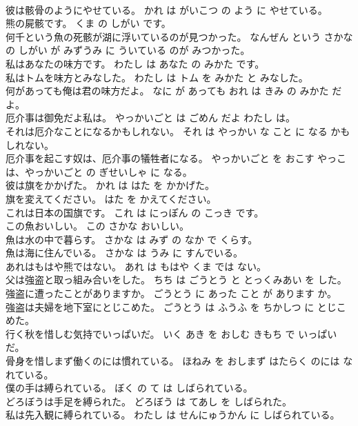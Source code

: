 \documentclass[8pt]{extreport}
\begin{document}
\begin{CJK}{UTF8}{min}
\\	彼は骸骨のようにやせている。	かれ は がいこつ の よう に やせている。	
\\	熊の屍骸です。	くま の しがい です。	
\\	何千という魚の死骸が湖に浮いているのが見つかった。	なんぜん という さかな の しがい が みずうみ に ういている のが みつかった。	
\\	私はあなたの味方です。	わたし は あなた の みかた です。	
\\	私はトムを味方とみなした。	わたし は トム を みかた と みなした。	
\\	何があっても俺は君の味方だよ。	なに が あっても おれ は きみ の みかた だよ。	
\\	厄介事は御免だよ私は。	やっかいごと は ごめん だよ わたし は。	
\\	それは厄介なことになるかもしれない。	それ は やっかい な こと に なる かもしれない。	
\\	厄介事を起こす奴は、厄介事の犠牲者になる。	やっかいごと を おこす やっこ は、やっかいごと の ぎせいしゃ に なる。	
\\	彼は旗をかかげた。	かれ は はた を かかげた。	
\\	旗を変えてください。	はた を かえてください。	
\\	これは日本の国旗です。	これ は にっぽん の こっき です。	
\\	この魚おいしい。	この さかな おいしい。	
\\	魚は水の中で暮らす。	さかな は みず の なか で くらす。	
\\	魚は海に住んでいる。	さかな は うみ に すんでいる。	
\\	あれはもはや熊ではない。	あれ は もはや くま では ない。	
\\	父は強盗と取っ組み合いをした。	ちち は ごうとう と とっくみあい を した。	
\\	強盗に遭ったことがありますか。	ごうとう に あった こと が あります か。	
\\	強盗は夫婦を地下室にとじこめた。	ごうとう は ふうふ を ちかしつ に とじこめた。	
\\	行く秋を惜しむ気持でいっぱいだ。	いく あき を おしむ きもち で いっぱい だ。	
\\	骨身を惜しまず働くのには慣れている。	ほねみ を おしまず はたらく のには なれている。	
\\	僕の手は縛られている。	ぼく の て は しばられている。	
\\	どろぼうは手足を縛られた。	どろぼう は てあし を しばられた。	
\\	私は先入観に縛られている。	わたし は せんにゅうかん に しばられている。	

\end{CJK}
\end{document}
